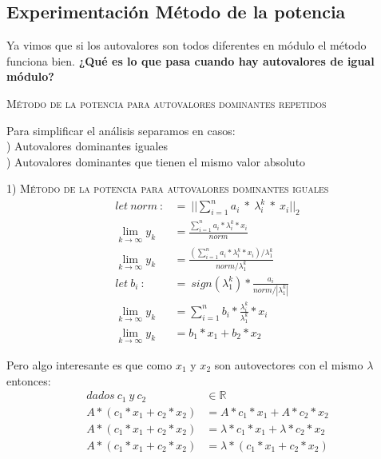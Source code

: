 
\vspace{1em}
\subsection{Experimentación Método de la potencia} 

\begin{large}  
    Ya vimos que si los autovalores son todos diferentes en módulo el método funciona bien. \textbf{¿Qué es lo que pasa cuando hay autovalores de igual módulo?}
\end{large}   


\vspace{2em}
\noindent \textsc{Método de la potencia para autovalores dominantes repetidos}

\vspace{2em}
\noindent Para simplificar el análisis separamos en casos: \\
) Autovalores dominantes iguales \\
) Autovalores dominantes que tienen el mismo valor absoluto
\vspace{2em}



\noindent \textsc{1) Método de la potencia para autovalores dominantes iguales}
\begin{align}
    let \ norm \ :&= \ ||\sum_{i=1}^{n} a_i \ * \ \lambda_{i}^{k} \ * \ x_i||_2 \\
    \lim_{k \to \infty} y_k &= \frac{\sum_{i=1}^{n} a_i * \lambda_{i}^{k} * x_i }{norm} \\ 
    \lim_{k \to \infty} y_k &= \frac{(\sum_{i=1}^{n} a_i * \lambda_{i}^{k} * x_i) / \lambda_{1}^{k}}{norm / \lambda_{1}^{k}} \\
    let \ b_i \ :&= \ sign(\lambda_{1}^{k}) * \frac{a_i}{norm / |\lambda_{1}^{k}|} \\
    \lim_{k \to \infty} y_k &= \sum_{i=1}^{n} b_i * \frac{\lambda_{i}^{k}}{\lambda_{1}^{k}} * x_i \\
    \lim_{k \to \infty} y_k &= b_1 * x_1 + b_2 * x_2 
\end{align}

\vspace{1em}
Pero algo interesante es que como $x_1$ y $x_2$ son autovectores con el mismo $\lambda$ entonces:
\begin{align}
    dados\ c_1 \ y \ c_2 &\in \mathbb{R} \\
    A * (c_1 * x_1 + c_2 * x_2) &= A * c_1 * x_1 + A * c_2 * x_2 \\
    A * (c_1 * x_1 + c_2 * x_2) &= \lambda * c_1 * x_1 + \lambda * c_2 * x_2 \\
    A * (c_1 * x_1 + c_2 * x_2) &= \lambda * (c_1 * x_1 + c_2 * x_2) 
\end{align}

